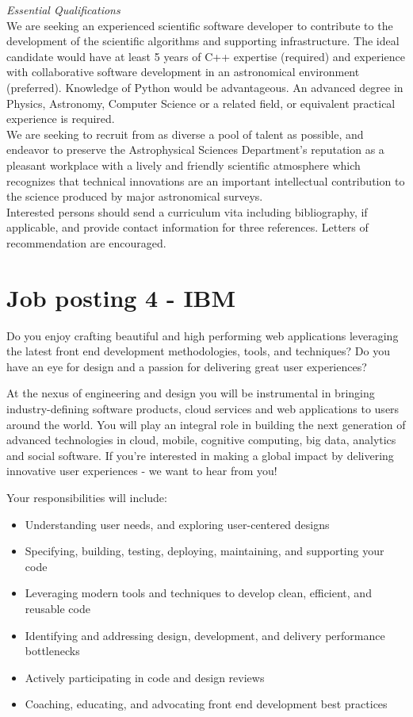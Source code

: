 \textit{Essential Qualifications}\\
We are seeking an experienced scientific software developer to contribute to the development of the scientific algorithms and supporting infrastructure. The ideal candidate would have at least 5 years of C++ expertise (required) and experience with collaborative software development in an astronomical environment (preferred). Knowledge of Python would be advantageous. An advanced degree in Physics, Astronomy, Computer Science or a related field, or equivalent practical experience is required.\\

We are seeking to recruit from as diverse a pool of talent as possible, and endeavor to preserve the Astrophysical Sciences Department's reputation as a pleasant workplace with a lively and friendly scientific atmosphere which recognizes that technical innovations are an important intellectual contribution to the science produced by major astronomical surveys.\\

Interested persons should send a curriculum vita including bibliography, if applicable, and provide contact information for three references. Letters of recommendation are encouraged.

\section{Job posting 4 - IBM}\label{sec:job-posting-four}
Do you enjoy crafting beautiful and high performing web applications leveraging the latest front end development methodologies, tools, and techniques? Do you have an eye for design and a passion for delivering great user experiences?

At the nexus of engineering and design you will be instrumental in bringing industry-defining software products, cloud services and web applications to users around the world. You will play an integral role in building the next generation of advanced technologies in cloud, mobile, cognitive computing, big data, analytics and social software. If you're interested in making a global impact by delivering innovative user experiences - we want to hear from you!

Your responsibilities will include:
\begin{itemize}
\item Understanding user needs, and exploring user-centered designs
\item Specifying, building, testing, deploying, maintaining, and supporting your code
\item Leveraging modern tools and techniques to develop clean, efficient, and reusable code
\item Identifying and addressing design, development, and delivery performance bottlenecks
\item Actively participating in code and design reviews
\item Coaching, educating, and advocating front end development best practices
\end{itemize}

